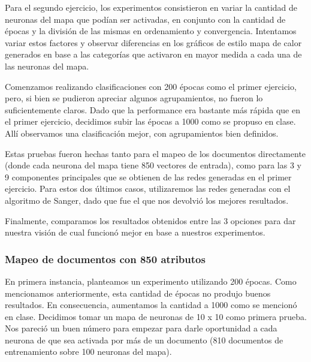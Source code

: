 Para el segundo ejercicio, los experimentos consistieron en variar la cantidad de neuronas del mapa que podían ser activadas, en conjunto con la cantidad de épocas y la división de las mismas en ordenamiento y convergencia. Intentamos variar estos factores y observar diferencias en los gráficos de estilo mapa de calor generados en base a las categorías que activaron en mayor medida a cada una de las neuronas del mapa.

Comenzamos realizando clasificaciones con 200 épocas como el primer ejercicio, pero, si bien se pudieron apreciar algunos agrupamientos, no fueron lo suficientemente claros. Dado que la performance era bastante más rápida que en el primer ejercicio, decidimos subir las épocas a 1000 como se propuso en clase. Allí observamos una clasificación mejor, con agrupamientos bien definidos.

Estas pruebas fueron hechas tanto para el mapeo de los documentos directamente (donde cada neurona del mapa tiene 850 vectores de entrada), como para las 3 y 9 componentes principales que se obtienen de las redes generadas en el primer ejercicio. Para estos dos últimos casos, utilizaremos las redes generadas con el algoritmo de Sanger, dado que fue el que nos devolvió los mejores resultados.

Finalmente, comparamos los resultados obtenidos entre las 3 opciones para dar nuestra visión de cual funcionó mejor en base a nuestros experimentos.

\subsubsection{Mapeo de documentos con 850 atributos}

En primera instancia, planteamos un experimento utilizando 200 épocas. Como mencionamos anteriormente, esta cantidad de épocas no produjo buenos resultados. En consecuencia, aumentamos la cantidad a 1000 como se mencionó en clase. Decidimos tomar un mapa de neuronas de 10 x 10 como primera prueba. Nos pareció un buen número para empezar para darle oportunidad a cada neurona de que sea activada por más de un documento (810 documentos de entrenamiento sobre 100 neuronas del mapa). 

